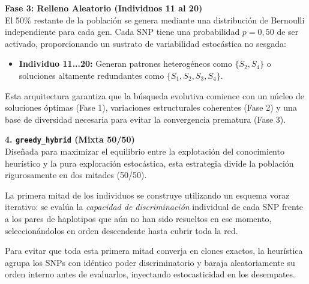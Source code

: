 \documentclass[a4paper,10pt]{article}
\begin{document}
\begin{itemize}
    \textbf{Fase 3: Relleno Aleatorio (Individuos 11 al 20)} \\
    El 50\% restante de la población se genera mediante una distribución de Bernoulli independiente para cada gen. Cada SNP tiene una probabilidad $p=0,50$ de ser activado, proporcionando un sustrato de variabilidad estocástica no sesgada:
    \begin{itemize}
        \item \textbf{Individuo 11...20:} Generan patrones heterogéneos como $\{S_2, S_4\}$ o soluciones altamente redundantes como $\{S_1, S_2, S_3, S_4\}$.
    \end{itemize}
    
    Esta arquitectura garantiza que la búsqueda evolutiva comience con un núcleo de soluciones óptimas (Fase 1), variaciones estructurales coherentes (Fase 2) y una base de diversidad necesaria para evitar la convergencia prematura (Fase 3).
\end{itemize}

\textbf{4. \texttt{greedy\_hybrid} (Mixta 50/50)} \\
Diseñada para maximizar el equilibrio entre la explotación del conocimiento heurístico y la pura exploración estocástica, esta estrategia divide la población rigurosamente en dos mitades (50/50). 

La primera mitad de los individuos se construye utilizando un esquema voraz iterativo: se evalúa la \textit{capacidad de discriminación} individual de cada SNP frente a los pares de haplotipos que aún no han sido resueltos en ese momento, seleccionándolos en orden descendente hasta cubrir toda la red. 

Para evitar que toda esta primera mitad converja en clones exactos, la heurística agrupa los SNPs con idéntico poder discriminatorio y baraja aleatoriamente su orden interno antes de evaluarlos, inyectando estocasticidad en los desempates. 
\end{document}
